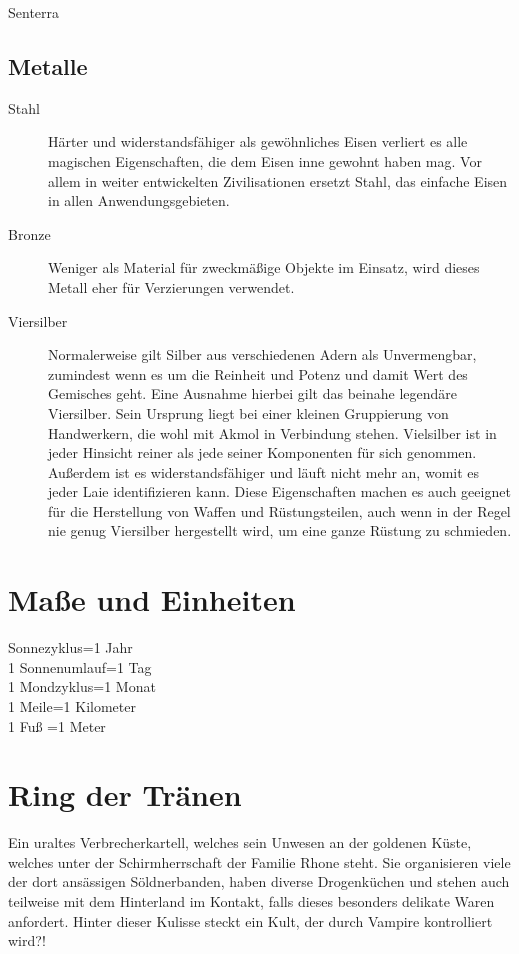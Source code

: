 \documentclass[a4paper,12pt,oneside]{book}
\begin{document}
\begin{description}
\item[Senterra]
\end{description}
\section{Metalle}
\begin{description}
\item[Stahl]Härter und widerstandsfähiger als gewöhnliches Eisen verliert es alle magischen Eigenschaften, die dem Eisen inne gewohnt haben mag. Vor allem in weiter entwickelten Zivilisationen ersetzt Stahl, das einfache Eisen in allen Anwendungsgebieten.
\item[Bronze]Weniger als Material für zweckmäßige Objekte im Einsatz, wird dieses Metall eher für Verzierungen verwendet.
\item[Viersilber]Normalerweise gilt Silber aus verschiedenen Adern als Unvermengbar, zumindest wenn es um die Reinheit und Potenz und damit Wert des Gemisches geht. Eine Ausnahme hierbei gilt das beinahe legendäre Viersilber. Sein Ursprung liegt bei einer kleinen Gruppierung von Handwerkern, die wohl mit Akmol in Verbindung stehen. Vielsilber ist in jeder Hinsicht reiner als jede seiner Komponenten für sich genommen. Außerdem ist es widerstandsfähiger und läuft nicht mehr an, womit es jeder Laie identifizieren kann. Diese Eigenschaften machen es auch geeignet für die Herstellung von Waffen und Rüstungsteilen, auch wenn in der Regel nie genug Viersilber hergestellt wird, um eine ganze Rüstung zu schmieden.
\end{description}


\chapter{Maße und Einheiten}
Sonnezyklus=1 Jahr
\\1 Sonnenumlauf=1 Tag
\\1 Mondzyklus=1 Monat
\\1 Meile=1 Kilometer
\\1 Fuß =1 Meter

\chapter{Ring der Tränen}
Ein uraltes Verbrecherkartell, welches sein Unwesen an der goldenen Küste, welches unter der Schirmherrschaft der Familie Rhone steht. Sie organisieren viele der dort ansässigen Söldnerbanden, haben diverse Drogenküchen und stehen auch teilweise mit dem Hinterland im Kontakt, falls dieses besonders delikate Waren anfordert. Hinter dieser Kulisse steckt ein Kult, der durch Vampire kontrolliert wird?!
\end{document}
